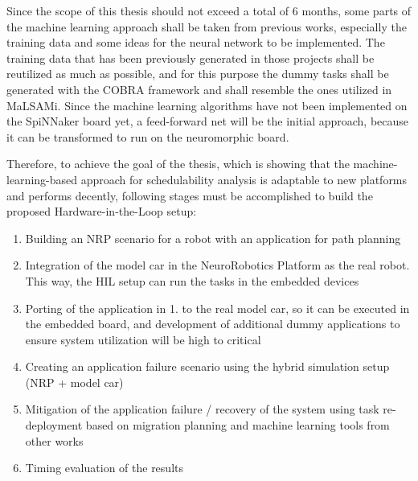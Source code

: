 Since the scope of this thesis should not exceed a total of 6 months, some parts of the machine learning approach shall be taken from previous works, especially the training data and some ideas for the neural network to be implemented. The training data that has been previously generated in those projects shall be reutilized as much as possible, and for this purpose the dummy tasks shall be generated with the COBRA framework and shall resemble the ones utilized in MaLSAMi. Since the machine learning algorithms have not been implemented on the SpiNNaker board yet, a feed-forward net will be the initial approach, because it can be transformed to run on the neuromorphic board.

Therefore, to achieve the goal of the thesis, which is showing that the machine-learning-based approach for schedulability analysis is adaptable to new platforms and performs decently, following stages must be accomplished to build the proposed Hardware-in-the-Loop setup:
\begin{enumerate}
\item	Building an NRP scenario for a robot with an application for path planning
\item	Integration of the model car in the NeuroRobotics Platform as the real robot. This way, the HIL setup can run the tasks in the embedded devices
\item	Porting of the application in 1. to the real model car, so it can be executed in the embedded board, and development of additional dummy applications to ensure system utilization will be high to critical
\item	Creating an application failure scenario using the hybrid simulation setup (NRP + model car)
\item	Mitigation of the application failure / recovery of the system using task re-deployment based on migration planning and machine learning tools from other works
\item	Timing evaluation of the results
\end{enumerate}

